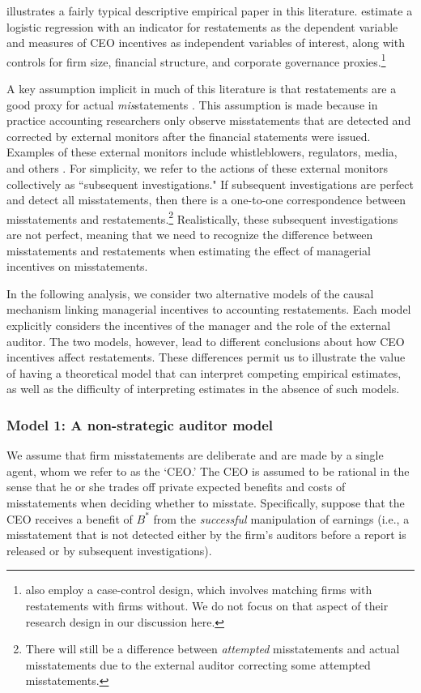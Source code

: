 \citet{Efendi:2007ja} illustrates a fairly typical descriptive empirical paper in this literature. 
\citet[p.\,687]{Efendi:2007ja} estimate a logistic regression with an indicator for restatements as the dependent variable and measures of CEO incentives as independent variables of interest, along with controls for firm size, financial structure, and corporate governance proxies.\footnote{
\citet{Efendi:2007ja} also employ a case-control design, which involves matching firms with restatements with firms without.
We do not focus on that aspect of their research design in our discussion here.}
 
A key assumption implicit in much of this literature is that restatements are a good proxy for actual \emph{mis}statements \citep[e.g.,][]{Efendi:2007ja,Armstrong:2010jd}. 
This assumption is made because in practice accounting researchers only observe misstatements that are detected and corrected by external monitors after the financial statements were issued. 
Examples of these external monitors include whistleblowers, regulators, media, and others \citep[e.g.,][]{Dyck:2010kh}.  
For simplicity,  we refer to the actions of these external monitors collectively as ``subsequent investigations."
If subsequent investigations are perfect and detect all misstatements, then there is a one-to-one correspondence between misstatements and restatements.\footnote{There will still be a difference between \emph{attempted} misstatements and actual misstatements due to the external auditor correcting some attempted misstatements.}
Realistically, these subsequent investigations are not perfect, meaning that we need to recognize the difference between misstatements and restatements when estimating the effect of managerial incentives on misstatements.  

In the following analysis, we consider two alternative models of the causal mechanism linking managerial incentives to accounting restatements.
Each model explicitly considers the incentives of the manager and the role of the external auditor. 
The two models, however, lead to different conclusions about how CEO incentives affect
restatements. 
These differences permit us to illustrate the value of having a theoretical model that can interpret competing empirical estimates, as well as the difficulty of interpreting estimates in the absence of such models.

\subsubsection{Model 1: A non-strategic auditor model}
We assume that firm misstatements are deliberate and are made by a single agent, whom we refer 
to as the `CEO.' 
The CEO is assumed to be rational in the sense that he or she trades off private expected benefits and costs of misstatements when deciding whether to misstate.
Specifically, suppose that the CEO receives a benefit of $B^*$ from the \emph{successful} manipulation of earnings (i.e., a misstatement that is not detected either by the firm's auditors before a report is released or by subsequent investigations). 

